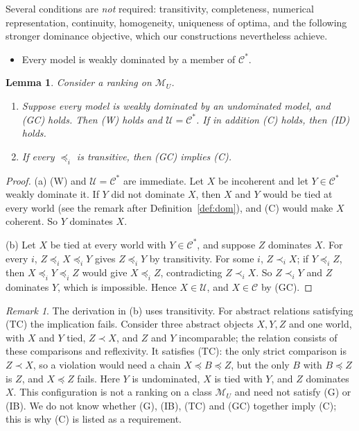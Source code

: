 \documentclass[11pt]{article}
\newcommand{\M}{\mathcal{M}}
\theoremstyle{plain}
\newtheorem{lemma}[theorem]{Lemma}
\theoremstyle{definition}
\theoremstyle{remark}
\newtheorem{remark}[theorem]{Remark}
\begin{document}
Several conditions are \emph{not} required: transitivity, completeness, numerical
representation, continuity, homogeneity, uniqueness of optima, and the following stronger
dominance objective, which our constructions nevertheless achieve.
\begin{itemize}
  \item[(W)] Every model is weakly dominated by a member of $\mathcal C^\ast$.
\end{itemize}

\begin{lemma}\label{lem:dominance}
Consider a ranking on $\M_U$.
\begin{enumerate}[label=(\alph*)]
  \item Suppose every model is weakly dominated by an undominated model, and (GC) holds.
  Then (W) holds and $\mathcal U=\mathcal C^\ast$. If in addition (C) holds, then (ID)
  holds.
  \item If every $\preceq_i$ is transitive, then (GC) implies (C).
\end{enumerate}
\end{lemma}

\begin{proof}
(a) (W) and $\mathcal U=\mathcal C^\ast$ are immediate. Let $X$ be incoherent and let
$Y\in\mathcal C^\ast$ weakly dominate it. If $Y$ did not dominate $X$, then $X$ and $Y$
would be tied at every world (see the remark after Definition~\ref{def:dom}), and (C)
would make $X$ coherent. So $Y$ dominates $X$.

(b) Let $X$ be tied at every world with $Y\in\mathcal C^\ast$, and suppose $Z$ dominates
$X$. For every $i$, $Z\preceq_iX\preceq_iY$ gives $Z\preceq_iY$ by transitivity. For some
$i$, $Z\prec_iX$; if $Y\preceq_iZ$, then $X\preceq_iY\preceq_iZ$ would give $X\preceq_iZ$,
contradicting $Z\prec_iX$. So $Z\prec_iY$ and $Z$ dominates $Y$, which is impossible.
Hence $X\in\mathcal U$, and $X\in\mathcal C$ by (GC).
\end{proof}

\begin{remark}\label{rem:TC}
The derivation in (b) uses transitivity. For abstract relations satisfying (TC) the
implication fails. Consider three abstract objects $X,Y,Z$ and one world, with $X$ and $Y$
tied, $Z\prec X$, and $Z$ and $Y$ incomparable; the relation consists of these comparisons
and reflexivity. It satisfies (TC): the only strict comparison is $Z\prec X$, so a
violation would need a chain $X\preceq B\preceq Z$, but the only $B$ with $B\preceq Z$ is
$Z$, and $X\preceq Z$ fails. Here $Y$ is undominated, $X$ is tied with $Y$, and $Z$
dominates $X$. This configuration is not a ranking on a class $\M_U$ and need not satisfy
(G) or (IB). We do not know whether (G), (IB), (TC) and (GC) together imply (C); this is
why (C) is listed as a requirement.
\end{remark}
\end{document}
